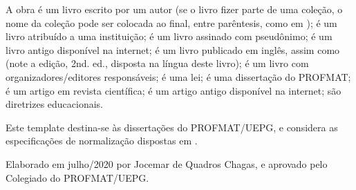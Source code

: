 \documentclass[a4paper,12pt]{report}%
\begin{document}
A obra \cite{STEWART} é um livro escrito por um autor (se o livro fizer parte de uma coleção, o nome da coleção pode ser colocada ao final, entre parêntesis, como em \cite{BOTELHO}); \cite{UEPG} é um livro atribuído a uma instituição; \cite{TAHAN} é um livro assinado com pseudônimo; \cite{EULERE212} é um livro antigo disponível na internet;  \cite{CAJORI} é um livro publicado em inglês, assim como \cite{GRAHAM} (note a edição, 2nd. ed., disposta na língua deste livro); \cite{KOBUCHEI} é um livro com organizadores/editores responsáveis; \cite{BRASIL1996} é uma lei; \cite{GALVAO} é uma dissertação do PROFMAT; \cite{MACHADO} é um artigo em revista científica; \cite{EULERE637} é um artigo antigo disponível na internet; \cite{PARANA} são diretrizes educacionais. 

\vspace{0.3cm}
Este template destina-se às dissertações do PROFMAT/UEPG, e considera as especificações de normalização dispostas em \cite{UEPG}. 

Elaborado em julho/2020 por Jocemar de Quadros Chagas, e aprovado pelo Colegiado do PROFMAT/UEPG. 

\newpage

%
%
\end{document}
